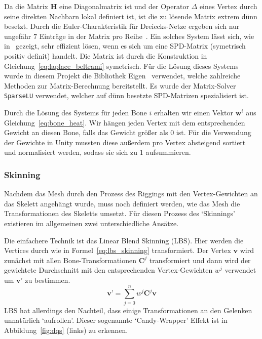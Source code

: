 Da die Matrix $\textbf{H}$ eine Diagonalmatrix ist und der Operator $\Delta$ eines Vertex durch seine direkten Nachbarn lokal definiert ist, ist die zu lösende Matrix extrem dünn besetzt. Durch die Euler-Charakteristik für Dreiecks-Netze ergeben sich nur ungefähr $7$ Einträge in der Matrix pro Reihe~\cite{spd_solver_paper}. Ein solches System lässt sich, wie in~\cite{spd_solver_paper} gezeigt, sehr effizient lösen, wenn es sich um eine SPD-Matrix (symetrisch positiv definit) handelt. Die Matrix ist durch die Konstruktion in Gleichung~\ref{eq:laplace_beltrami} symetrisch. Für die Lösung dieses Systems wurde in diesem Projekt die Bibliothek Eigen~\cite{eigen} verwendet, welche zahlreiche Methoden zur Matrix-Berechnung bereitstellt. Es wurde der Matrix-Solver \texttt{SparseLU} verwendet, welcher auf dünn besetzte SPD-Matrizen spezialisiert ist.

Durch die Lösung des Systems für jeden Bone $i$ erhalten wir einen Vektor $\textbf{w}^i$ aus Gleichung~\ref{eq:bone_heat}. Wir hängen jeden Vertex mit dem entsprechenden Gewicht an diesen Bone, falls das Gewicht größer als $0$ ist. Für die Verwendung der Gewichte in Unity mussten diese außerdem pro Vertex absteigend sortiert und normalisiert werden, sodass sie sich zu $1$ aufsummieren.

\subsubsection{Skinning}\label{skinning}
Nachdem das Mesh durch den Prozess des Riggings mit den Vertex-Gewichten an das Skelett angehängt wurde, muss noch definiert werden, wie das Mesh die Transformationen des Skeletts umsetzt. Für diesen Prozess des `Skinnings' existieren im allgemeinen zwei unterschiedliche Ansätze.

Die einfachere Technik ist das Linear Blend Skinning (LBS). Hier werden die Vertices durch wie in Formel~\ref{eq:lbs_skinning} transformiert. Der Vertex $\textbf{v}$ wird zunächst mit allen Bone-Transformationen $\textbf{C}^j$ transformiert und dann wird der gewichtete Durchschnitt mit den entsprechenden Vertex-Gewichten $w^j$ verwendet um $\textbf{v'}$ zu bestimmen.
\begin{equation}
	\label{eq:lbs_skinning}
	\textbf{v'} = \sum_{j=0}^n w^{j} \textbf{C}^j \textbf{v}
\end{equation}
LBS hat allerdings den Nachteil, dass einige Transformationen an den Gelenken unnatürlich `aufrollen'. Dieser sogenannte `Candy-Wrapper' Effekt ist in Abbildung~\ref{fig:dqs} (links) zu erkennen.

